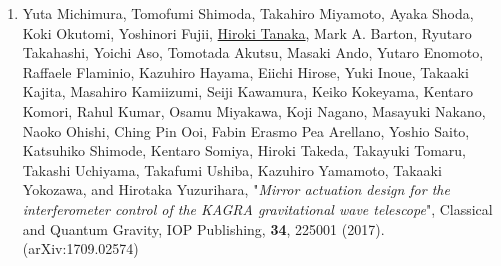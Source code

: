 \documentclass[uplatex, 11pt]{jsarticle}
\begin{document}
\begin{enumerate}
\item Yuta Michimura, Tomofumi Shimoda, Takahiro Miyamoto, Ayaka Shoda, Koki Okutomi, Yoshinori Fujii, \uline{Hiroki Tanaka}, Mark A. Barton, Ryutaro Takahashi, Yoichi Aso, Tomotada Akutsu, Masaki Ando, Yutaro Enomoto, Raffaele Flaminio, Kazuhiro Hayama, Eiichi Hirose, Yuki Inoue, Takaaki Kajita, Masahiro Kamiizumi, Seiji Kawamura, Keiko Kokeyama, Kentaro Komori, Rahul Kumar, Osamu Miyakawa, Koji Nagano, Masayuki Nakano, Naoko Ohishi, Ching Pin Ooi, Fabin Erasmo Pea Arellano, Yoshio Saito, Katsuhiko Shimode, Kentaro Somiya, Hiroki Takeda, Takayuki Tomaru, Takashi Uchiyama, Takafumi Ushiba, Kazuhiro Yamamoto, Takaaki Yokozawa, and Hirotaka Yuzurihara, "\emph{Mirror actuation design for the interferometer control of the KAGRA gravitational wave telescope}", Classical and Quantum Gravity, IOP Publishing, {\bf 34}, 225001 (2017). (arXiv:1709.02574)
\end{enumerate}
\end{document}
